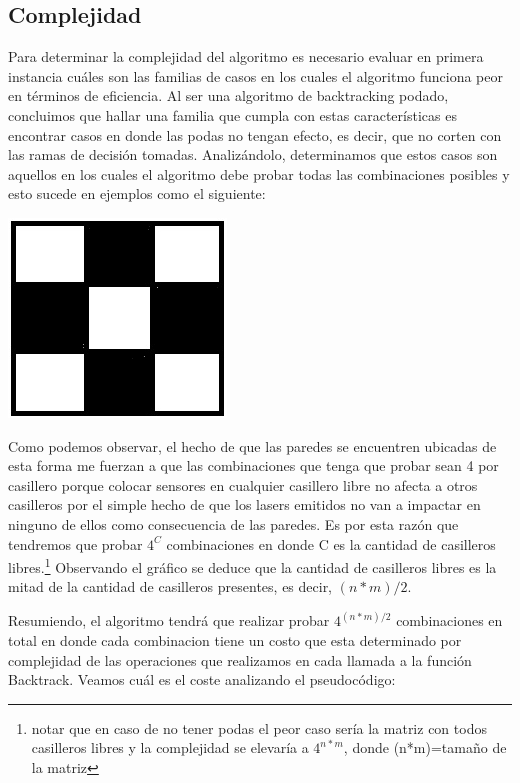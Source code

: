 \subsection{Complejidad}
Para determinar la complejidad del algoritmo es necesario evaluar en primera instancia cuáles son las familias de casos en los cuales el algoritmo funciona peor en términos de eficiencia. Al ser una algoritmo de backtracking podado, concluimos que hallar una familia que cumpla con estas características es encontrar casos en donde las podas no tengan efecto, es decir, que no corten con las ramas de decisión tomadas. Analizándolo, determinamos que estos casos son aquellos en los cuales el algoritmo debe probar todas las combinaciones posibles y esto sucede en ejemplos como el siguiente:

\includegraphics[scale=0.5]{ej3/imgs/ajedrezDibujo.png}

Como podemos observar, el hecho de que las paredes se encuentren ubicadas de esta forma me fuerzan a que las combinaciones que tenga que probar sean 4 por casillero porque colocar sensores en cualquier casillero libre no afecta a otros casilleros por el simple hecho de que los lasers emitidos no van a impactar en ninguno de ellos como consecuencia de las paredes. Es por esta razón que tendremos que probar $4^C$ combinaciones en donde C es la cantidad de casilleros libres.\footnote{notar que en caso de no tener podas el peor caso sería la matriz con todos casilleros libres y la complejidad se elevaría a $4^{n*m}$, donde (n*m)=tamaño de la matriz} Observando el gráfico se deduce que la cantidad de casilleros libres es la mitad de la cantidad de casilleros presentes, es decir, $(n*m)/2$.

Resumiendo, el algoritmo tendrá que realizar probar $4^{(n*m)/2}$ combinaciones en total en donde cada combinacion tiene un costo que esta determinado por complejidad de las operaciones que realizamos en cada llamada a la función Backtrack. Veamos cuál es el coste analizando el pseudocódigo:

